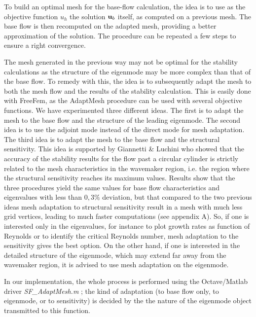 \documentclass[twocolumn,10pt]{asme2ej}
\begin{document}
To build an optimal mesh for the base-flow calculation, the idea is to use as the objective function $u_h$ the solution ${\bf u}_b$ itself, as computed on a previous mesh.%
The base flow is then recomputed on the adapted mesh, providing a better approximation of the solution. The procedure can be repeated a few steps to ensure a right convergence.

The mesh generated in the previous way may not be optimal for the stability calculations as the structure of the eigenmode may be more complex than that of the base flow. To remedy with this, the idea is to subsequently adapt the mesh to both the mesh flow and the results of the stability calculation. This is easily done with FreeFem, as the  AdaptMesh procedure can be used with several objective functions. We have experimented three different ideas. The first is to adapt the mesh to the base flow and the structure of the leading eigenmode. The second idea is to use the adjoint mode instead of the direct mode for mesh adaptation.
The third idea is to adapt the mesh to the base flow and the structural sensitivity. This idea is supported by Giannetti \& Luchini\cite{GiannettiLuchini} who showed that the accuracy of the stability results for the flow past a circular cylinder is strictly related to the mesh characteristics in the wavemaker region, i.e. the region where the structural sensitivity reaches its maximum values. 
Results show that the three procedures yield the same values for base flow characteristics and eigenvalues with less than $0,3\%$ deviation, but that compared to the two previous ideas mesh adaptation to structural sensitivity result in a mesh with much less grid vertices, leading to much faster computations (see appendix A). So, if one is interested only in the eigenvalues, for instance to plot growth rates as function of Reynolds or to identify the critical Reynolds number, mesh adaptation to the sensitivity gives the best option. On the other hand, if one is interested in the detailed structure of the eigenmode, which may extend far away from the wavemaker region, it is advised to use mesh adaptation on the eigenmode. 

In our implementation, the whole process is performed using the Octave/Matlab driver {\em SF\_AdaptMesh.m} ; the kind of adaptation  (to base flow only, to eigenmode, or to sensitivity) is decided by the the nature of the eigenmode object transmitted to this function.
\end{document}
